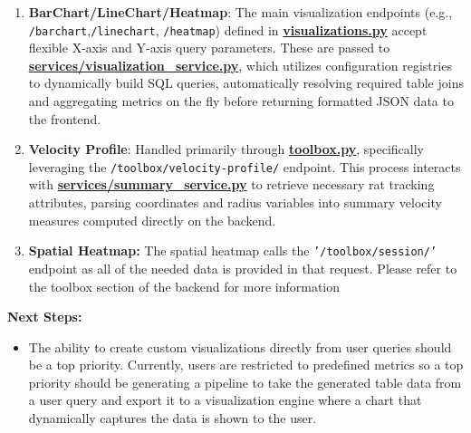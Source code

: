 \documentclass{article}
\begin{document}
\begin{enumerate}

  \item{\textbf{BarChart/LineChart/Heatmap}: The main visualization endpoints (e.g., \texttt{/barchart},\newline \texttt{/linechart}, \texttt{/heatmap}) defined in \href{https://github.com/OCD-Rats-Capstone/OCD-Rat-Infrastructure/blob/main/src/ocd-rat-backend/routers/visualizations.py}{\textbf{visualizations.py}} accept flexible X-axis and Y-axis query parameters. These are passed to \href{https://github.com/OCD-Rats-Capstone/OCD-Rat-Infrastructure/blob/main/src/ocd-rat-backend/services/visualization_service.py}{\textbf{services/visualization\_service.py}}, which utilizes configuration registries to dynamically build SQL queries, automatically resolving required table joins and aggregating metrics on the fly before returning formatted JSON data to the frontend.}
  \item{\textbf{Velocity Profile}: Handled primarily through \href{https://github.com/OCD-Rats-Capstone/OCD-Rat-Infrastructure/blob/main/src/ocd-rat-backend/routers/toolbox.py}{\textbf{toolbox.py}}, specifically leveraging the \texttt{/toolbox/velocity-profile/} endpoint. This process interacts with \href{https://github.com/OCD-Rats-Capstone/OCD-Rat-Infrastructure/blob/main/src/ocd-rat-backend/services/summary_service.py}{\textbf{services/summary\_service.py}} to retrieve necessary rat tracking attributes, parsing coordinates and radius variables into summary velocity measures computed directly on the backend.}
  \item{\textbf{Spatial Heatmap: }The spatial heatmap calls the \texttt{'/toolbox/session/'} endpoint as all of the needed data is provided in that request. Please refer to the toolbox section of the backend
  for more information}
\end{enumerate}

\par{\textbf{Next Steps:}}
\begin{itemize}
  \item{The ability to create custom visualizations directly from user queries should be a top priority. Currently, users are restricted
  to predefined metrics so a top priority should be generating a pipeline to take the generated table data from a user query and export it to a visualization
  engine where a chart that dynamically captures the data is shown to the user.}
\end{itemize}
\end{document}
